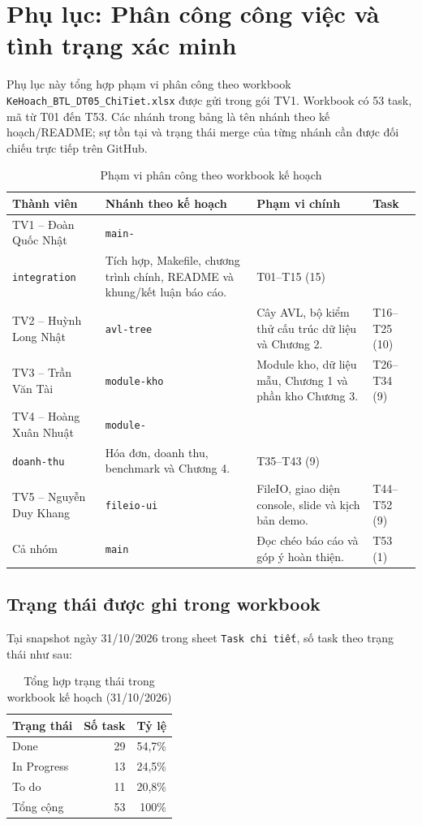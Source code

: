 \chapter*{Phụ lục: Phân công công việc và tình trạng xác minh}

Phụ lục này tổng hợp phạm vi phân công theo workbook \texttt{KeHoach\_BTL\_DT05\_ChiTiet.xlsx} được gửi trong gói TV1. Workbook có 53 task, mã từ T01 đến T53. Các nhánh trong bảng là tên nhánh theo kế hoạch/README; sự tồn tại và trạng thái merge của từng nhánh cần được đối chiếu trực tiếp trên GitHub.

\begin{table}[H]
\centering
\caption{Phạm vi phân công theo workbook kế hoạch}
\small
\begin{tabular}{@{}p{2.3cm}p{2.2cm}p{5.2cm}p{2.2cm}@{}}
\toprule
\textbf{Thành viên} & \textbf{Nhánh theo kế hoạch} & \textbf{Phạm vi chính} & \textbf{Task} \\
\midrule
TV1 -- Đoàn Quốc Nhật & \texttt{main-}\\\texttt{integration} & Tích hợp, Makefile, chương trình chính, README và khung/kết luận báo cáo. & T01--T15 (15) \\
TV2 -- Huỳnh Long Nhật & \texttt{avl-tree} & Cây AVL, bộ kiểm thử cấu trúc dữ liệu và Chương 2. & T16--T25 (10) \\
TV3 -- Trần Văn Tài & \texttt{module-kho} & Module kho, dữ liệu mẫu, Chương 1 và phần kho Chương 3. & T26--T34 (9) \\
TV4 -- Hoàng Xuân Nhuật & \texttt{module-}\\\texttt{doanh-thu} & Hóa đơn, doanh thu, benchmark và Chương 4. & T35--T43 (9) \\
TV5 -- Nguyễn Duy Khang & \texttt{fileio-ui} & FileIO, giao diện console, slide và kịch bản demo. & T44--T52 (9) \\
Cả nhóm & \texttt{main} & Đọc chéo báo cáo và góp ý hoàn thiện. & T53 (1) \\
\bottomrule
\end{tabular}
\end{table}

\section*{Trạng thái được ghi trong workbook}
Tại snapshot ngày 31/10/2026 trong sheet \texttt{Task chi tiết}, số task theo trạng thái như sau:
\begin{table}[H]
\centering
\caption{Tổng hợp trạng thái trong workbook kế hoạch (31/10/2026)}
\begin{tabular}{@{}lrr@{}}
\toprule
\textbf{Trạng thái} & \textbf{Số task} & \textbf{Tỷ lệ} \\
\midrule
Done & 29 & 54,7\% \\
In Progress & 13 & 24,5\% \\
To do & 11 & 20,8\% \\
\midrule
Tổng cộng & 53 & 100\% \\
\bottomrule
\end{tabular}
\end{table}


